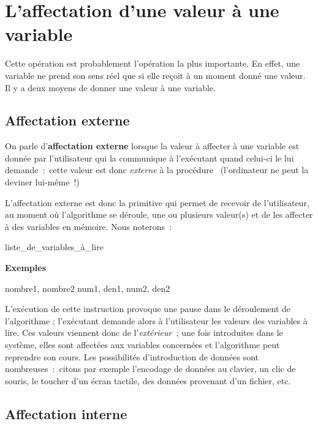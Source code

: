 			 
	\section{L’affectation d’une valeur à une variable}

		Cette opération est probablement l’opération la plus importante. En
		effet, une variable ne prend son sens réel que si elle reçoit à un
		moment donné une valeur. Il y a deux moyens de donner une valeur à une
		variable.

		\subsection{Affectation externe }

			On parle d’\textbf{affectation externe} lorsque la valeur à affecter à
			une variable est donnée par l’utilisateur qui la communique à
			l’exécutant quand celui-ci le lui demande~:~cette valeur est donc
			\textit{externe} à la procédure \ (l’ordinateur ne peut la deviner
			lui-même~!)

			L’affectation externe est donc la primitive qui permet de recevoir de
			l’utilisateur, au moment où l’algorithme se déroule,
			une ou plusieurs valeur(s) et de les affecter à des variables en
			mémoire. Nous noterons~:

			\begin{Pseudocode}
			\Read liste\_de\_variables\_à\_lire
			\end{Pseudocode}
			
			{\bfseries Exemples}
			
			\begin{Pseudocode}
			\Read nombre1, nombre2
			\Read num1, den1, num2, den2
			\end{Pseudocode}
			
			L’exécution de cette instruction provoque une
			pause dans le déroulement de l’algorithme ; 
			l’exécutant demande alors à l’utilisateur 
			les valeurs des variables à lire. 
			Ces valeurs viennent donc de l’\textit{extérieur~}; 
			une fois introduites dans le système,
			elles sont affectées aux variables concernées 
			et l’algorithme peut reprendre son cours. 
			Les possibilités d’introduction de données 
			sont nombreuses~:~citons par exemple l’encodage de
			données au clavier, un clic de souris, le toucher d’un
			écran tactile, des données provenant d’un fichier, etc.

		\subsection{Affectation interne}\label{affinterne}


